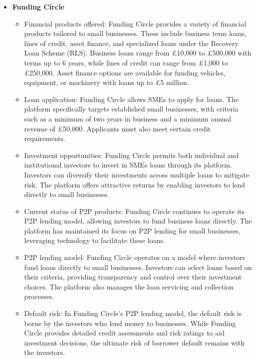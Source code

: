 \documentclass{article}
\begin{document}
\begin{itemize}
    \item \textbf{Funding Circle}
        \begin{itemize}
            \item Financial products offered: Funding Circle provides a variety of financial products tailored to small businesses. These include business term loans, lines of credit, asset finance, and specialized loans under the Recovery Loan Scheme (RLS). Business loans range from £10,000 to £500,000 with terms up to 6 years, while lines of credit can range from £1,000 to £250,000. Asset finance options are available for funding vehicles, equipment, or machinery with loans up to £5 million.
            \item Loan application: Funding Circle allows SMEs to apply for loans. The platform specifically targets established small businesses, with criteria such as a minimum of two years in business and a minimum annual revenue of £50,000. Applicants must also meet certain credit requirements.
            \item Investment opportunities: Funding Circle permits both individual and institutional investors to invest in SMEs loans through its platform. Investors can diversify their investments across multiple loans to mitigate risk. The platform offers attractive returns by enabling investors to lend directly to small businesses.
            \item Current status of P2P products: Funding Circle continues to operate its P2P lending model, allowing investors to fund business loans directly. The platform has maintained its focus on P2P lending for small businesses, leveraging technology to facilitate these loans.
            \item P2P lending model: Funding Circle operates on a model where investors fund loans directly to small businesses. Investors can select loans based on their criteria, providing transparency and control over their investment choices. The platform also manages the loan servicing and collection processes.
            \item Default risk: In Funding Circle’s P2P lending model, the default risk is borne by the investors who lend money to businesses. While Funding Circle provides detailed credit assessments and risk ratings to aid investment decisions, the ultimate risk of borrower default remains with the investors.
        \end{itemize}  


\end{itemize}
\end{document}
